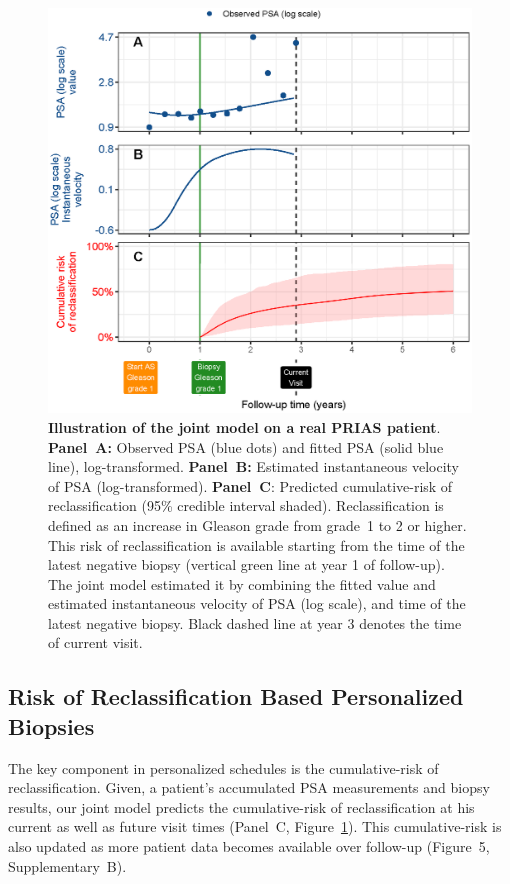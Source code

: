 \begin{figure}
\centerline{\includegraphics[width=\columnwidth]{images/jmExplanationPlot_113.eps}}
\caption{\textbf{Illustration of the joint model on a real PRIAS patient}. \textbf{Panel~A:} Observed PSA (blue dots) and fitted PSA (solid blue line), log-transformed. \textbf{Panel~B:} Estimated instantaneous velocity of PSA (log-transformed). \textbf{Panel~C}: Predicted cumulative-risk of reclassification (95\% credible interval shaded). Reclassification is defined as an increase in Gleason grade from grade~1 to 2 or higher. This risk of reclassification is available starting from the time of the latest negative biopsy (vertical green line at year 1 of follow-up). The joint model estimated it by combining the fitted value and estimated instantaneous velocity of PSA (log scale), and time of the latest negative biopsy. Black dashed line at year 3 denotes the time of current visit.}
\label{fig:jmExplanationPlot_113}
\end{figure}

\subsection{Risk of Reclassification Based Personalized Biopsies}
The key component in personalized schedules is the cumulative-risk of reclassification. Given, a patient's accumulated PSA measurements and biopsy results, our joint model predicts the cumulative-risk of reclassification at his current as well as future visit times (Panel~C, Figure~\ref{fig:jmExplanationPlot_113}). This cumulative-risk is also updated as more patient data becomes available over follow-up (Figure~5, Supplementary~B).

